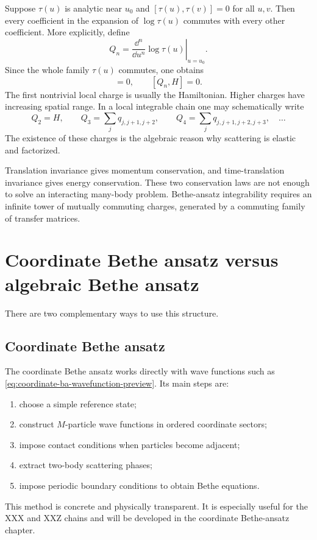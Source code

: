Suppose $\tau(u)$ is analytic near $u_0$ and $[\tau(u),\tau(v)]=0$ for all $u,v$.
Then every coefficient in the expansion of $\log\tau(u)$ commutes with every other
coefficient.  More explicitly, define
\begin{equation}
    Q_n
    =
    \left.
    \frac{\dd^n}{\dd u^n}\log\tau(u)
    \right|_{u=u_0} .
\end{equation}
Since the whole family $\tau(u)$ commutes, one obtains
\begin{equation}
    [Q_m,Q_n]=0,
    \qquad
    [Q_n,H]=0 .
\end{equation}
The first nontrivial local charge is usually the Hamiltonian.  Higher charges
have increasing spatial range.  In a local integrable chain one may schematically
write
\begin{equation}
    Q_2=H,
    \qquad
    Q_3=\sum_j q_{j,j+1,j+2},
    \qquad
    Q_4=\sum_j q_{j,j+1,j+2,j+3},
    \quad \ldots
\end{equation}
The existence of these charges is the algebraic reason why scattering is
elastic and factorized.

\begin{remark}
Translation invariance gives momentum conservation, and time-translation
invariance gives energy conservation.  These two conservation laws are not enough
to solve an interacting many-body problem.  Bethe-ansatz integrability requires an
infinite tower of mutually commuting charges, generated by a commuting family of
transfer matrices.
\end{remark}

\section{Coordinate Bethe ansatz versus algebraic Bethe ansatz}
\label{sec:coordinate-vs-algebraic-ba-preview}

There are two complementary ways to use this structure.

\subsection{Coordinate Bethe ansatz}

The coordinate Bethe ansatz works directly with wave functions such as
\cref{eq:coordinate-ba-wavefunction-preview}.  Its main steps are:
\begin{enumerate}[label=(\roman*)]
    \item choose a simple reference state;
    \item construct $M$-particle wave functions in ordered coordinate sectors;
    \item impose contact conditions when particles become adjacent;
    \item extract two-body scattering phases;
    \item impose periodic boundary conditions to obtain Bethe equations.
\end{enumerate}
This method is concrete and physically transparent.  It is especially useful for
the XXX and XXZ chains and will be developed in the coordinate Bethe-ansatz
chapter.

